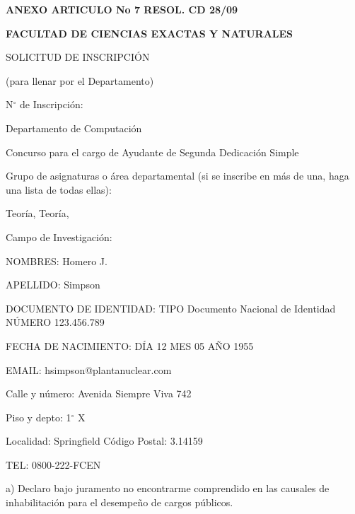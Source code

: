 \documentclass{article}
\newcommand{\cargo}[1]{\noindent Concurso para el cargo de {#1} \hspace{0.5cm} Dedicación Simple}
\newcommand{\areas}[3]{\noindent Grupo de asignaturas o área departamental (si se inscribe en más de una, haga una lista de todas ellas):

\medskip

\noindent {#1}\def\temp{#2}\ifx\temp\empty \else, {#2}\fi\def\temp{#3}\ifx\temp\empty \else, {#3} \fi}
\newcommand{\apellido}[1]{\noindent APELLIDO: {#1}}
\newcommand{\nombre}[1]{\noindent NOMBRES: {#1}}
\newcommand{\dni}[1]{\noindent DOCUMENTO DE IDENTIDAD: TIPO Documento Nacional de Identidad \hspace{0.25cm} NÚMERO {#1}}
\newcommand{\fechaNacimiento}[3]{\noindent FECHA DE NACIMIENTO: DÍA {#1} \hspace{0.1cm} MES {#2} {\hspace{0.1cm}} AÑO {#3}}
\newcommand{\domicilio}[5]{\noindent Calle y número: {#1}

\noindent Piso y depto: {#2}

\noindent Localidad: {#3} {\hspace{3cm}} Código Postal: {#4}

\noindent TEL: {#5}
}
\newcommand{\email}[1]{\noindent EMAIL: {#1}}
\newcommand{\legajo}[1]{\noindent NÚMERO DE LEGAJO: {#1}}
\begin{document}
\begin{center}
{\bf ANEXO ARTICULO No 7 RESOL. CD 28/09}
\end{center}
{\bf \noindent FACULTAD DE CIENCIAS EXACTAS Y NATURALES

\noindent SOLICITUD DE INSCRIPCIÓN}

\bigskip

\noindent (para llenar por el Departamento) 

\bigskip

\noindent N$^\circ$ de Inscripción: \hdashrule{4cm}{0.5pt}{0.75pt}

\medskip

\noindent Departamento de Computación

\cargo{Ayudante de Segunda}

\areas{Algoritmos}{Teoría}{}

\medskip

\noindent \hdashrule{\linewidth}{0.5pt}{0.75pt}

\noindent Campo de Investigación:

\medskip

\noindent \hdashrule{\linewidth}{0.5pt}{0.75pt}

\medskip

\noindent \hdashrule{\linewidth}{0.5pt}{0.75pt}

\medskip

\noindent \hrulefill

\bigskip

\nombre{Homero J.}

\medskip

\apellido{Simpson}

\medskip

\dni{123.456.789}

\medskip

\fechaNacimiento{12}{05}{1955}

\medskip

\email{hsimpson@plantanuclear.com}

% 

\bigskip

\domicilio{Avenida Siempre Viva 742}{1$^\circ$ X}{Springfield}{3.14159}{0800-222-FCEN}

\bigskip
\bigskip
\bigskip
\bigskip


\noindent a) Declaro bajo juramento no encontrarme comprendido en las causales
de inhabilitación para el desempeño de cargos públicos.
\end{document}
